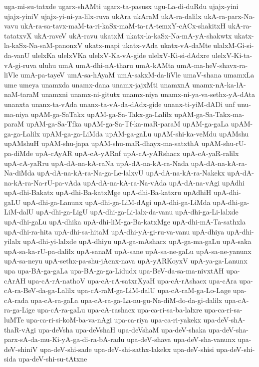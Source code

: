 {uga-mi-su-tatxde
ugarx-shAMti
ugarx-ta-pasusx
ugu-La-di-duRdu
ujajx-yini
ujajx-yiniV
ujajx-yi-ni-ya-lilx-ruva
ukAra
ukAraM
ukA-ra-dalilx
ukA-ra-parx-Na-vavu
ukA-ra-sa-tavx-maM-ta-ri-kaSx-maM-ta-rA-temxY-cACx-shakitxH
ukA-ra-tatatxvX
ukA-raveV
ukA-ravu
ukatxM
ukatx-la-kaSx-Na-mA-yA-shakwtx
ukatx-la-kaSx-Na-saM-panonxV
ukatx-mapi
ukatx-vAda
ukatx-vA-daMte
ulalxM-Gi-si-da-vanU
ulelxKa
ulelxVKa
ulelxV-Ka-vA-gide
ulelxV-Ki-si-dAdxre
ulelxV-Ki-ta-vA-gi-ruva
uluhu
umA
umA-dhi-nA-tharu
umA-kAMta
umA-ma-heV-shavx-ra-liVle
umA-pa-tayeV
umA-sa-hAyaM
umA-sakxM-da-liVle
umaV-shana
umamxLa
ume
umeya
unamxda
unamx-dana
unamx-jajxMti
unamxnA
unamx-nA-ka-lA-naM-taraM
unamxni
unamx-ni-gitutx
unamx-niya
unamx-ni-ya-va-sethx-yA-dAta
unanxta
unanx-ta-vAda
unanx-ta-vA-da-dAdx-gide
unanx-ti-yiM-dADi
unf
unu-ma-niya
upAM-ga-SaTakx
upAM-ga-Sa-Takx-ga-Lalilx
upAM-ga-Sa-Takx-ma-paraM
upAM-ga-Sa-Tfka
upAM-ga-Sa-Tf-ka-maR-paraM
upAM-ga-gaLa
upAM-ga-ga-Lalilx
upAM-ga-ga-LiMda
upAM-ga-gaLu
upAM-shi-ka-veMdu
upAMshu
upAMshuH
upAM-shu-japa
upAM-shu-maR-dhayx-ma-satxthA
upAM-shu-rU-pa-diMde
upA-cAyAR
upA-cA-yARnf
upA-cA-yARshacx
upA-cA-yaR-ralilx
upA-cA-yaRru
upA-dA-na-kA-raNa
upA-dA-na-kA-ra-Nada
upA-dA-na-kA-ra-Na-diMda
upA-dA-na-kA-ra-Na-ga-Le-lalxvU
upA-dA-na-kA-ra-Nakekx
upA-dA-na-kA-ra-Na-rU-pa-vAda
upA-dA-na-kA-ra-Na-vAda
upA-dA-na-vAgi
upAdhi
upA-dhi-Bakatx
upA-dhi-Ba-katxMge
upA-dhi-Ba-katxru
upAdhiH
upA-dhi-gaLU
upA-dhi-ga-Lanunx
upA-dhi-ga-LiM-dAgi
upA-dhi-ga-LiMda
upA-dhi-ga-LiM-dalU
upA-dhi-ga-LigU
upA-dhi-ga-Li-lalx-da-vanu
upA-dhi-ga-Li-lalxde
upA-dhi-gaLu
upA-dhika
upA-dhi-liM-ga-Ba-katxMge
upA-dhi-mA-Ta-sathxla
upA-dhi-ra-hita
upA-dhi-sa-hitaM
upA-dhi-yA-gi-ru-va-vanu
upA-dhiya
upA-dhi-yilalx
upA-dhi-yi-lalxde
upA-dhiyu
upA-ga-mAshacx
upA-ga-ma-gaLu
upA-saka
upA-sa-ka-rU-pa-dalilx
upA-sanaM
upA-sane
upA-sa-ne-gaLu
upA-sa-ne-yanunx
upA-sa-neyu
upA-sethx-pa-shu-jAcnx-nava
upA-yARKoyxV
upA-ya-ga-Lanunx
upa
upa-BA-ga-gaLa
upa-BA-ga-ga-Lidudx
upa-BeV-da-sa-ma-nivxtAH
upa-cArAH
upa-cA-rA-nathoV
upa-cA-rA-satxrXyaH
upa-cA-rAshacx
upa-cAra
upa-cA-ra-BeV-da-ga-Lalilx
upa-cA-raM-ga-LiM-dalU
upa-cA-raM-ga-Lo-Lage
upa-cA-rada
upa-cA-ra-gaLa
upa-cA-ra-ga-La-nu-gu-Na-diM-do-da-gi-dalilx
upa-cA-ra-ga-Lige
upa-cA-ra-gaLu
upa-cA-rashacx
upa-ca-ri-sa-ba-lalxre
upa-ca-ri-sa-luMTe
upa-ca-ri-si-koM-ba-va-nAgi
upa-ca-riya
upa-ca-ri-yakekx
upa-deV-shA-thaR-vAgi
upa-deVsha
upa-deVshaH
upa-deVshaM
upa-deV-shaka
upa-deV-sha-parx-sA-da-mu-Ki-yA-ga-di-ra-bA-radu
upa-deV-shava
upa-deV-sha-vanunx
upa-deV-shiniV
upa-deV-shi-sade
upa-deV-shi-sathx-lakekx
upa-deV-shisi
upa-deV-shi-sida
upa-deV-shi-su-tAtxne
}
